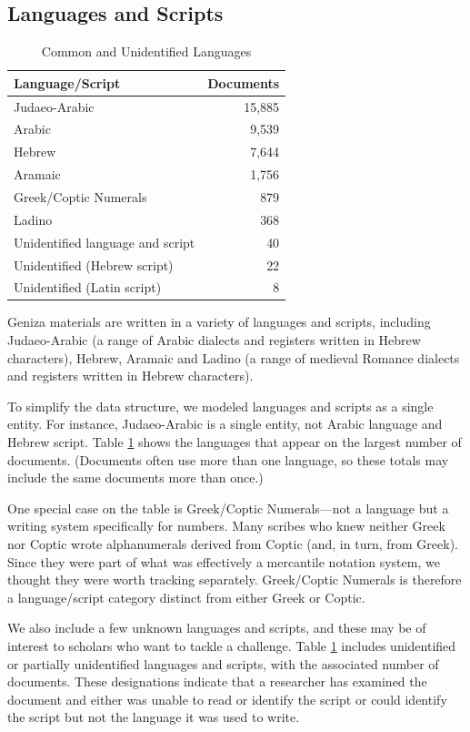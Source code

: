 \documentclass{article}
\begin{document}
\subsection{Languages and Scripts}

\begin{table}
\caption{Common and Unidentified Languages}
\label{table:langs_docs}
\begin{tabular}{lr}
\toprule
Language/Script & Documents \\
\midrule
Judaeo-Arabic & 15,885 \\
Arabic & 9,539 \\
Hebrew & 7,644 \\
Aramaic & 1,756 \\
Greek/Coptic Numerals & 879 \\
Ladino & 368 \\
\midrule
Unidentified language and script & 40 \\
Unidentified (Hebrew script) & 22 \\
Unidentified (Latin script) & 8 \\
\bottomrule
\end{tabular}
\end{table}

Geniza materials are written in a variety of languages and scripts, including Judaeo-Arabic (a range of Arabic dialects and registers written in Hebrew characters), Hebrew, Aramaic and Ladino (a range of medieval Romance dialects and registers written in Hebrew characters).

To simplify the data structure, we modeled languages and scripts as a single entity. For instance, Judaeo-Arabic is a single entity, not Arabic language and Hebrew script. Table \ref{table:langs_docs} shows the languages that appear on the largest number of documents. (Documents often use more than one language, so these totals may include the same documents more than once.) 

One special case on the table is Greek/Coptic Numerals—not a language but a writing system specifically for numbers. Many scribes who knew neither Greek nor Coptic wrote alphanumerals derived from Coptic (and, in turn, from Greek). Since they were part of what was effectively a mercantile notation system, we thought they were worth tracking separately. Greek/Coptic Numerals is therefore a language/script category distinct from either Greek or Coptic.

We also include a few unknown languages and scripts, and these may be of interest to scholars who want to tackle a challenge. Table \ref{table:langs_docs} includes unidentified or partially unidentified languages and scripts, with the associated number of documents. These designations indicate that a researcher has examined the document and either was unable to read or identify the script or could identify the script but not the language it was used to write.
\end{document}
